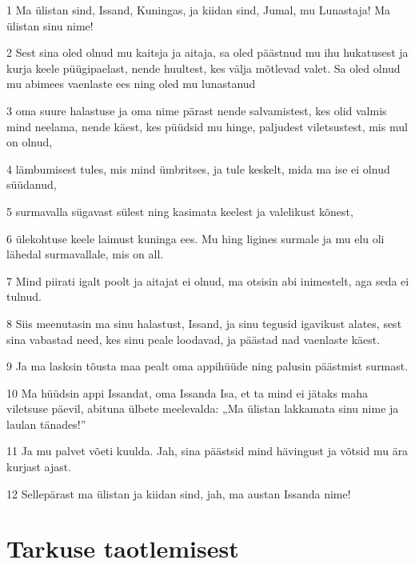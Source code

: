 \par 1 Ma ülistan sind, Issand, Kuningas, ja kiidan sind, Jumal, mu Lunastaja! Ma ülistan sinu nime!
\par 2 Sest sina oled olnud mu kaitsja ja aitaja, sa oled päästnud mu ihu hukatusest ja kurja keele püügipaelast, nende huultest, kes välja mõtlevad valet. Sa oled olnud mu abimees vaenlaste ees ning oled mu lunastanud
\par 3 oma suure halastuse ja oma nime pärast nende salvamistest, kes olid valmis mind neelama, nende käest, kes püüdsid mu hinge, paljudest viletsustest, mis mul on olnud,
\par 4 lämbumisest tules, mis mind ümbritses, ja tule keskelt, mida ma ise ei olnud süüdanud,
\par 5 surmavalla sügavast sülest ning kasimata keelest ja valelikust kõnest,
\par 6 ülekohtuse keele laimust kuninga ees. Mu hing ligines surmale ja mu elu oli lähedal surmavallale, mis on all.
\par 7 Mind piirati igalt poolt ja aitajat ei olnud, ma otsisin abi inimestelt, aga seda ei tulnud.
\par 8 Siis meenutasin ma sinu halastust, Issand, ja sinu tegusid igavikust alates, sest sina vabastad need, kes sinu peale loodavad, ja päästad nad vaenlaste käest.
\par 9 Ja ma lasksin tõusta maa pealt oma appihüüde ning palusin päästmist surmast.
\par 10 Ma hüüdsin appi Issandat, oma Issanda Isa, et ta mind ei jätaks maha viletsuse päevil, abituna ülbete meelevalda: „Ma ülistan lakkamata sinu nime ja laulan tänades!”
\par 11 Ja mu palvet võeti kuulda. Jah, sina päästsid mind hävingust ja võtsid mu ära kurjast ajast.
\par 12 Sellepärast ma ülistan ja kiidan sind, jah, ma austan Issanda nime!

\section*{Tarkuse taotlemisest}

